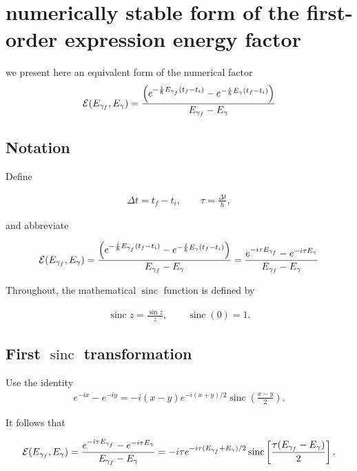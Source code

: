 \newpage

\section{ numerically stable form of the first-order expression energy factor}\label{sec:app-stable-first-order}

we present here an equivalent form of the numerical factor
\begin{align}
  {\cal E}(E_{\gamma_f},E_\gamma) = \frac{\left(e^{-\frac{i}{\hbar}E_{\gamma_f}(t_f-t_i)}-e^{-\frac{i}{\hbar}{ E_\gamma}(t_f-t_i)} \right)}{{E_{\gamma_f}- E_\gamma}}
\end{align}

\subsection{ Notation}

Define

\begin{align}\Delta t=t_f-t_i, \qquad
  \tau=\frac{\Delta t}{\hbar},
\end{align}

and abbreviate

\begin{align}
  {\cal E}(E_{\gamma_f},E_\gamma) = \frac{\left(e^{-\frac{i}{\hbar}E_{\gamma_f}(t_f-t_i)}-e^{-\frac{i}{\hbar}{ E_\gamma}(t_f-t_i)} \right)}{{E_{\gamma_f}- E_\gamma}}=
  \frac{e^{-i\tau E_{\gamma_f}}-e^{-i\tau E_{\gamma}}}{E_{\gamma_f}-E_\gamma}
\end{align}

Throughout, the mathematical $\operatorname{sinc}$ function is defined by

\begin{align}\operatorname{sinc}z=\frac{\sin z}{z}, \qquad
  \operatorname{sinc}(0)=1.
\end{align}

\subsection{ First $\operatorname{sinc}$ transformation}

Use the identity
\begin{align} e^{-ix}-e^{-iy} = -i(x-y)e^{-i(x+y)/2}\operatorname{sinc}\left(\frac{x-y}{2}\right).
\end{align}

It follows that
\begin{importantbox}
  \begin{align} {\cal E}(E_{\gamma_f},E_\gamma)=\frac{e^{-i\tau E_{\gamma_f}}-e^{-i\tau E_\gamma}}{E_{\gamma_f}-E_\gamma} = -i\tau
    e^{-i\tau(E_{\gamma_f}+E_\gamma)/2}        \operatorname{sinc} \left[
      \frac{\tau(E_{\gamma_f}-E_{\gamma})}{2}
    \right].\label{eq:app-E-sinc-form}
  \end{align}
\end{importantbox}

